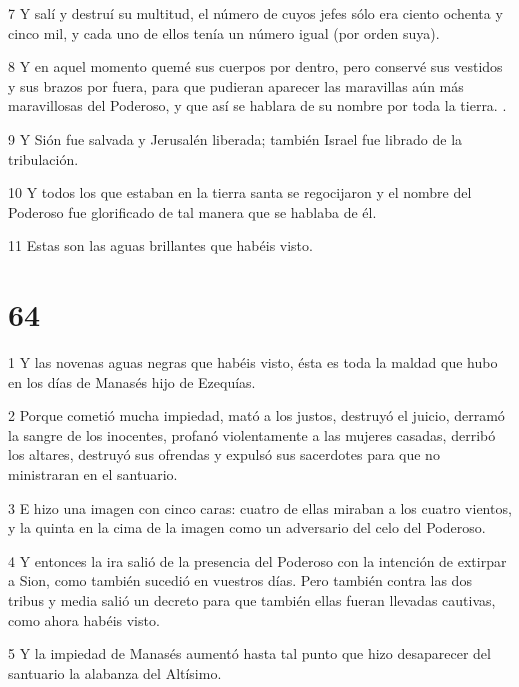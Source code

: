 \par 7 Y salí y destruí su multitud, el número de cuyos jefes sólo era ciento ochenta y cinco mil, y cada uno de ellos tenía un número igual (por orden suya).

\par 8 Y en aquel momento quemé sus cuerpos por dentro, pero conservé sus vestidos y sus brazos por fuera, para que pudieran aparecer las maravillas aún más maravillosas del Poderoso, y que así se hablara de su nombre por toda la tierra. .

\par 9 Y Sión fue salvada y Jerusalén liberada; también Israel fue librado de la tribulación.

\par 10 Y todos los que estaban en la tierra santa se regocijaron y el nombre del Poderoso fue glorificado de tal manera que se hablaba de él.

\par 11 Estas son las aguas brillantes que habéis visto.

\chapter{64}

\par 1 Y las novenas aguas negras que habéis visto, ésta es toda la maldad que hubo en los días de Manasés hijo de Ezequías.

\par 2 Porque cometió mucha impiedad, mató a los justos, destruyó el juicio, derramó la sangre de los inocentes, profanó violentamente a las mujeres casadas, derribó los altares, destruyó sus ofrendas y expulsó sus sacerdotes para que no ministraran en el santuario.

\par 3 E hizo una imagen con cinco caras: cuatro de ellas miraban a los cuatro vientos, y la quinta en la cima de la imagen como un adversario del celo del Poderoso.

\par 4 Y entonces la ira salió de la presencia del Poderoso con la intención de extirpar a Sion, como también sucedió en vuestros días. Pero también contra las dos tribus y media salió un decreto para que también ellas fueran llevadas cautivas, como ahora habéis visto.

\par 5 Y la impiedad de Manasés aumentó hasta tal punto que hizo desaparecer del santuario la alabanza del Altísimo.


